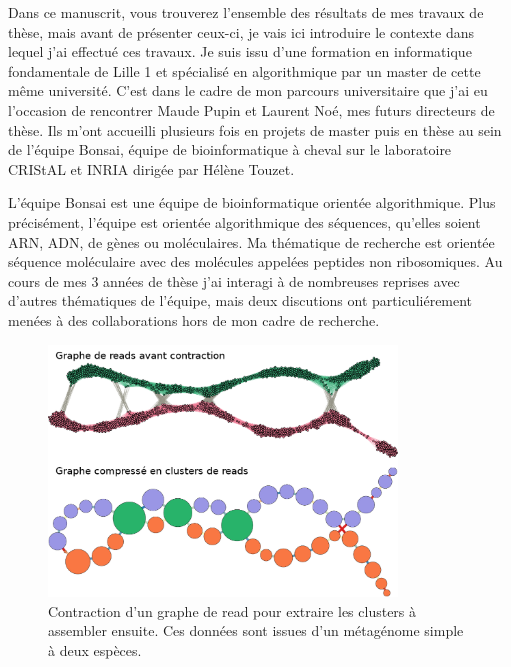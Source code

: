 Dans ce manuscrit, vous trouverez l'ensemble des résultats de mes travaux de thèse, mais avant de présenter ceux-ci, je vais ici introduire le contexte dans lequel j'ai effectué ces travaux.
Je suis issu d'une formation en informatique fondamentale de Lille 1 et spécialisé en algorithmique par un master de cette même université.
C'est dans le cadre de mon parcours universitaire que j'ai eu l'occasion de rencontrer Maude Pupin et Laurent Noé, mes futurs directeurs de thèse.
Ils m'ont accueilli plusieurs fois en projets de master puis en thèse au sein de l'équipe Bonsai, équipe de bioinformatique à cheval sur le laboratoire CRIStAL et INRIA dirigée par Hélène Touzet.

L'équipe Bonsai est une équipe de bioinformatique orientée algorithmique.
Plus précisément, l'équipe est orientée algorithmique des séquences, qu'elles soient ARN, ADN, de gènes ou moléculaires.
Ma thématique de recherche est orientée séquence moléculaire avec des molécules appelées peptides non ribosomiques.
Au cours de mes 3 années de thèse j'ai interagi à de nombreuses reprises avec d'autres thématiques de l'équipe, mais deux discutions ont particuliérement menées à des collaborations hors de mon cadre de recherche.

\begin{figure}[!ht]
  \begin{center}
    \includegraphics[width=350px]{Figures/preambule/pierre.png}
    \caption{\label{pierre}Contraction d'un graphe de read pour extraire les clusters à assembler ensuite.
    Ces données sont issues d'un métagénome simple à deux espèces.}
  \end{center}
\end{figure}

